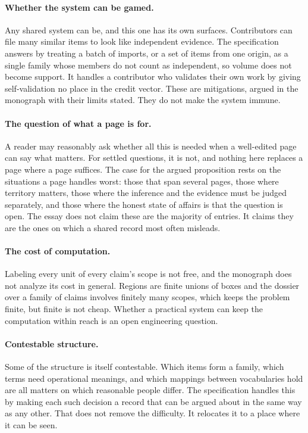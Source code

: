 \documentclass[11pt]{article}
\begin{document}
\paragraph{Whether the system can be gamed.} Any shared system can be, and this one has its own surfaces. Contributors can file many similar items to look like independent evidence. The specification answers by treating a batch of imports, or a set of items from one origin, as a single family whose members do not count as independent, so volume does not become support. It handles a contributor who validates their own work by giving self-validation no place in the credit vector. These are mitigations, argued in the monograph with their limits stated. They do not make the system immune.

\paragraph{The question of what a page is for.} A reader may reasonably ask whether all this is needed when a well-edited page can say what matters. For settled questions, it is not, and nothing here replaces a page where a page suffices. The case for the argued proposition rests on the situations a page handles worst: those that span several pages, those where territory matters, those where the inference and the evidence must be judged separately, and those where the honest state of affairs is that the question is open. The essay does not claim these are the majority of entries. It claims they are the ones on which a shared record most often misleads.

\paragraph{The cost of computation.} Labeling every unit of every claim's scope is not free, and the monograph does not analyze its cost in general. Regions are finite unions of boxes and the dossier over a family of claims involves finitely many scopes, which keeps the problem finite, but finite is not cheap. Whether a practical system can keep the computation within reach is an open engineering question.

\paragraph{Contestable structure.} Some of the structure is itself contestable. Which items form a family, which terms need operational meanings, and which mappings between vocabularies hold are all matters on which reasonable people differ. The specification handles this by making each such decision a record that can be argued about in the same way as any other. That does not remove the difficulty. It relocates it to a place where it can be seen.
\end{document}
